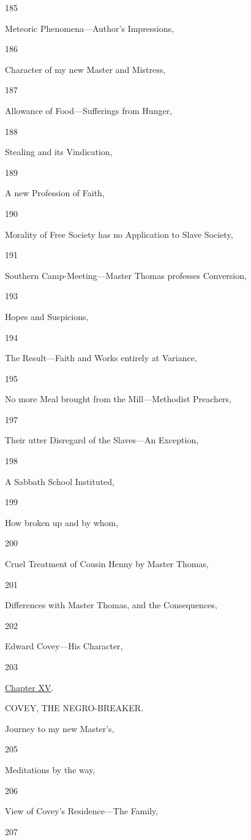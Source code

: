 185

Meteoric Phenomena---Author's Impressions,

186

Character of my new Master and Mistress,

187

Allowance of Food---Sufferings from Hunger,

188

Stealing and its Vindication,

189

A new Profession of Faith,

190

Morality of Free Society has no Application to Slave Society,

191

Southern Camp-Meeting---Master Thomas professes Conversion,

193

Hopes and Suspicions,

194

The Result---Faith and Works entirely at Variance,

195

No more Meal brought from the Mill---Methodist Preachers,

197

Their utter Disregard of the Slaves---An Exception,

198

A Sabbath School Instituted,

199

How broken up and by whom,

200

Cruel Treatment of Cousin Henny by Master Thomas,

201

Differences with Master Thomas, and the Consequences,

202

Edward Covey---His Character,

203

\href{/wiki/My_Bondage_and_My_Freedom_(1855)/Chapter_XV}{Chapter XV}.

COVEY, THE NEGRO-BREAKER.

Journey to my new Master's,

205

Meditations by the way,

206

View of Covey's Residence---The Family,

207

